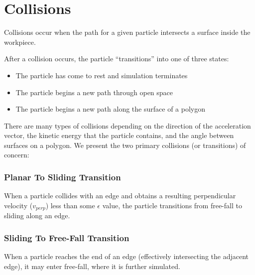 	\section{Collisions}

Collisions occur when the path for a given particle intersects a surface inside the workpiece.


After a collision occurs, the particle ``transitions'' into one of three states:

\begin{itemize}
\item The particle has come to rest and simulation terminates
\item The particle begins a new path through open space
\item The particle begins a new path along the surface of a polygon
\end{itemize}

There are many types of collisions depending on the direction of the acceleration vector, the kinetic energy that the particle contains, and the angle between surfaces on a polygon. We present the two primary collisions (or transitions) of concern:

		\subsubsection{Planar To Sliding Transition}

When a particle collides with an edge and obtains a resulting perpendicular velocity ($v_{perp}$) less than some $\epsilon$ value, the particle transitions from free-fall to sliding along an edge.




		\subsubsection{Sliding To Free-Fall Transition}

When a particle reaches the end of an edge (effectively intersecting the adjacent edge), it may enter free-fall, where it is further simulated.



